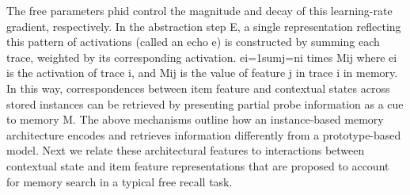 {}The free parameters \markdownRendererDollarSign{}phid\markdownRendererDollarSign{} control the magnitude and decay of this learning-rate gradient, respectively.\markdownRendererInterblockSeparator
{}In the abstraction step \markdownRendererDollarSign{}E\markdownRendererDollarSign{}, a single representation reflecting this pattern of activations (called an echo \markdownRendererDollarSign{}e\markdownRendererDollarSign{}) is constructed by summing each trace, weighted by its corresponding activation.\markdownRendererInterblockSeparator
{}\markdownRendererDollarSign{}\markdownRendererDollarSign{}e\markdownRendererLeftBrace{}i=1\markdownRendererRightBrace{}\markdownRendererBackslash{}sum\markdownRendererCircumflex{}\markdownRendererLeftBrace{}j=n\markdownRendererRightBrace{}i \markdownRendererBackslash{}times M\markdownRendererUnderscore{}\markdownRendererLeftBrace{}ij\markdownRendererRightBrace{}\markdownRendererDollarSign{}\markdownRendererDollarSign{}\markdownRendererInterblockSeparator
{}where \markdownRendererDollarSign{}ei\markdownRendererDollarSign{} is the activation of trace \markdownRendererDollarSign{}i\markdownRendererDollarSign{}, and \markdownRendererDollarSign{}M\markdownRendererUnderscore{}\markdownRendererLeftBrace{}ij\markdownRendererRightBrace{}\markdownRendererDollarSign{} is the value of feature \markdownRendererDollarSign{}j\markdownRendererDollarSign{} in trace \markdownRendererDollarSign{}i\markdownRendererDollarSign{} in memory.\markdownRendererInterblockSeparator
{}In this way, correspondences between item feature and contextual states across stored instances can be retrieved by presenting partial probe information as a cue to memory \markdownRendererDollarSign{}M\markdownRendererDollarSign{}.\markdownRendererInterblockSeparator
{}\markdownRendererInterblockSeparator
{}The above mechanisms outline how an instance-based memory architecture encodes and retrieves information differently from a prototype-based model. Next we relate these architectural features to interactions between contextual state and item feature representations that are proposed to account for memory search in a typical free recall task.\markdownRendererInterblockSeparator
